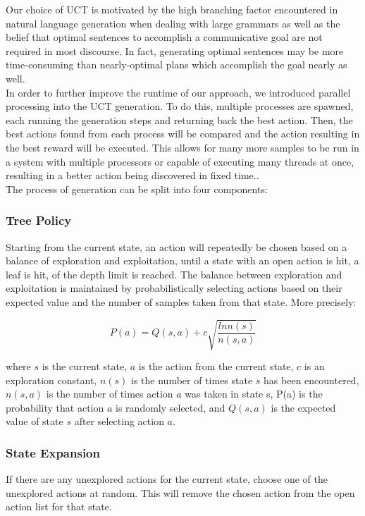 Our choice of UCT is motivated by the high branching factor encountered in natural language generation when dealing with large grammars as well as the belief that optimal sentences to accomplish a communicative goal are not required in most discourse.  In fact, generating optimal sentences may be more time-consuming than nearly-optimal plans which accomplish the goal nearly as well.\\

In order to further improve the runtime of our approach, we introduced parallel processing into the UCT generation.  To do this, multiple processes are spawned, each running the generation steps and returning back the best action.  Then, the best actions found from each process will be compared and the action resulting in the best reward will be executed.  This allows for many more samples to be run in a system with multiple processors or capable of executing many threads at once, resulting in a better action being discovered in fixed time..\\

The process of generation can be split into four components:

\subsubsection{Tree Policy}
Starting from the current state, an action will repeatedly be chosen based on a balance of exploration and exploitation, until a state with an open action is hit, a leaf is hit, of the depth limit is reached.  The balance between exploration and exploitation is maintained by probabilistically selecting actions based on their expected value and the number of samples taken from that state.  More precisely:

$$P(a) = Q(s,a) + c\sqrt{\frac{ln n(s)}{n(s,a)}}$$

where $s$ is the current state, $a$ is the action from the current state, $c$ is an exploration constant, $n(s)$ is the number of times state $s$ has been encountered, $n(s,a)$ is the number of times action $a$ was taken in state s, P(a) is the probability that action $a$ is randomly selected, and $Q(s,a)$ is the expected value of state $s$ after selecting action $a$.

\subsubsection{State Expansion}
If there are any unexplored actions for the current state, choose one of the unexplored actions at random.  This will remove the chosen action from the open action list for that state.

